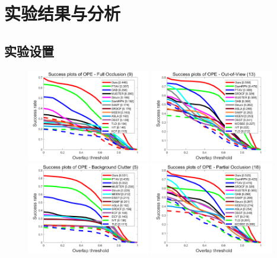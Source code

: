 \section{实验结果与分析}

\subsection{实验设置}

\begin{figure}[t!]
\begin{center}
	\includegraphics[width=0.48\textwidth]{Img/globally/UAV20L/FOC_overlap_OPE_AUC.png}
	\includegraphics[width=0.48\textwidth]{Img/globally/UAV20L/OV_overlap_OPE_AUC.png}
	\includegraphics[width=0.48\textwidth]{Img/globally/UAV20L/BC_overlap_OPE_AUC.png}
	\includegraphics[width=0.48\textwidth]{Img/globally/UAV20L/POC_overlap_OPE_AUC.png}

\end{center}
\end{figure}
